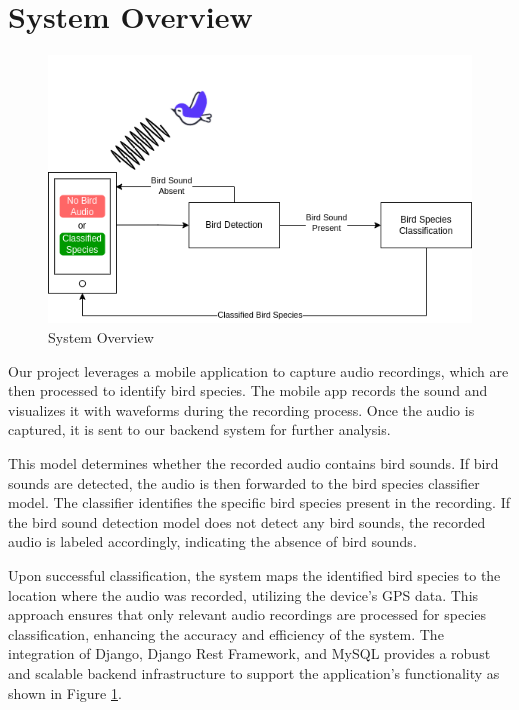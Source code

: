 \section{System Overview}
\begin{figure}[h!]
    \centering
    \includegraphics[scale=0.65]{images/System Overview.png}
    \caption{System Overview}\label{fig:system_overview}
\end{figure}
Our project leverages a mobile application to capture audio recordings, which
are then processed to identify bird species. The mobile app records the sound
and visualizes it with waveforms during the recording process. Once the audio
is captured, it is sent to our backend system for further analysis.

This model determines whether
the recorded audio contains bird sounds. If bird sounds are detected, the audio
is then forwarded to the bird species classifier model. The classifier
identifies the specific bird species present in the recording. If the bird sound detection model does not detect any bird
sounds, the recorded audio is labeled accordingly, indicating the absence of
bird sounds.

Upon successful classification, the system maps the identified bird species to
the location where the audio was recorded, utilizing the device's GPS data.
This approach ensures that only relevant audio recordings are processed for
species classification, enhancing the accuracy and efficiency of the system.
The integration of Django, Django Rest Framework, and MySQL provides a robust
and scalable backend infrastructure to support the application's functionality
as shown in Figure \ref{fig:system_overview}.
\\





